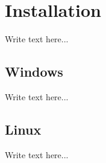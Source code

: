 
\section{Installation}
Write text here...

\subsection{Windows}
Write text here...

\subsection{Linux}
Write text here...


\clearpage
